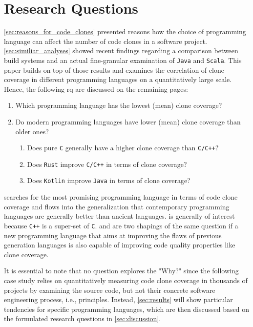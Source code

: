 
\section{Research Questions}
\label{sec:research_question}

\autoref{sec:reasons_for_code_clones} presented reasons how the choice of programming language can affect the number of code clones in a software project. \autoref{sec:similiar_analyses} showed recent findings regarding a comparison between build systems and an actual fine-granular examination of \texttt{Java} and \texttt{Scala}. This paper builds on top of those results and examines the correlation of clone coverage in different programming languages on a quantitatively large scale. Hence, the following \ac{rq} are discussed on the remaining pages:

\begin{enumerate}
	\item Which programming language has the lowest (mean) clone coverage? \label{question:clone_coverage_lowest}
	\item Do modern programming languages have lower (mean) clone coverage than older ones? \label{question:comparing_age}
	\begin{enumerate}
		\item Does pure \texttt{C} generally have a higher clone coverage than \texttt{C/C++}? \label{question:compare_c_cpp}
		\item Does \texttt{Rust} improve \texttt{C/C++} in terms of clone coverage? \label{question:compare_rust_c}
		\item Does \texttt{Kotlin} improve \texttt{Java} in terms of clone coverage? \label{question:compare_kotlin_java}
	\end{enumerate}
\end{enumerate}

 searches for the most promising programming language in terms of code clone coverage and flows into the generalization that contemporary programming languages are generally better than ancient languages.
 is generally of interest because \texttt{C++} is a super-set of \texttt{C}.   and  are two shapings of the same question if a new programming language that aims at improving the flaws of previous generation languages is also capable of improving code quality properties like clone coverage.

It is essential to note that no question explores the "Why?" since the following case study relies on quantitatively measuring code clone coverage in thousands of projects by examining the source code, but not their concrete software engineering process, i.e., principles. Instead, \autoref{sec:results} will show particular tendencies for specific programming languages, which are then discussed based on the formulated research questions in \autoref{sec:discussion}.
